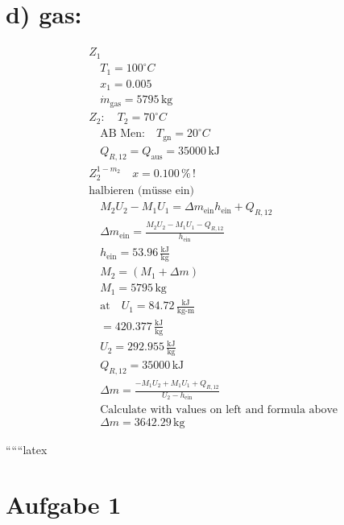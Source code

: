 \section*{d) gas: }

\begin{align*}
&Z_1 \\
&\quad T_1 = 100^\circ C \\
&\quad x_1 = 0.005 \\
&\quad \dot{m}_{\text{gas}} = 5795 \, \text{kg} \\
&Z_2: \quad T_2 = 70^\circ C \\
&\quad \text{AB Men:} \quad T_{\text{gn}} = 20^\circ C \\
&\quad Q_{R,12} = Q_{\text{aus}} = 35000 \, \text{kJ} \\
&Z_2^{1-m_2} \quad x = 0.100 \, \% \, ! \\
&\text{halbieren (müsse ein)} \\
&\quad M_2 U_2 - M_1 U_1 = \Delta m_{\text{ein}} h_{\text{ein}} + Q_{R,12} \\
&\quad \Delta m_{\text{ein}} = \frac{M_2 U_2 - M_1 U_1 - Q_{R,12}}{h_{\text{ein}}} \\
&\quad h_{\text{ein}} = 53.96 \, \frac{\text{kJ}}{\text{kg}} \\
&\quad M_2 = (M_1 + \Delta m) \\
&\quad M_1 = 5795 \, \text{kg} \\
&\quad \text{at} \quad U_1 = 84.72 \, \frac{\text{kJ}}{\text{kg-m}} \\
&\quad = 420.377 \, \frac{\text{kJ}}{\text{kg}} \\
&\quad U_2 = 292.955 \, \frac{\text{kJ}}{\text{kg}} \\
&\quad Q_{R,12} = 35000 \, \text{kJ} \\
&\quad \Delta m = \frac{-M_1 U_2 + M_1 U_1 + Q_{R,12}}{U_2 - h_{\text{ein}}} \\
&\quad \text{Calculate with values on left and formula above} \\
&\quad \Delta m = 3642.29 \, \text{kg}
\end{align*}

``````latex


\section*{Aufgabe 1}